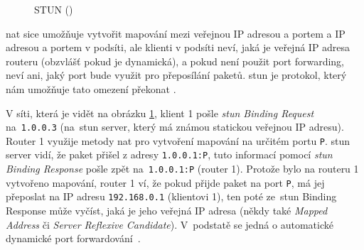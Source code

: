 \begin{figure}[H]
    \centering
    \caption{STUN (\publicPrivateIP)}
    \label{stunFig}
\end{figure}

\gls{nat} sice umožňuje vytvořit mapování mezi veřejnou IP adresou a portem a IP
adresou a portem v podsíti, ale klienti v podsíti neví, jaká je veřejná IP
adresa routeru (obzvlášť pokud je dynamická), a pokud není použit port
forwarding, neví ani, jaký port bude využit pro přeposílání paketů. \gls{stun}
je protokol, který nám umožňuje tato omezení překonat
\parencite{WebRTCForTheCurious}.

V síti, která je vidět na obrázku \ref{stunFig}, klient 1 pošle
\textit{\gls{stun} Binding Request} na~\texttt{1.0.0.3} (na~\gls{stun}
server, který má známou statickou veřejnou IP adresu). Router 1 využije metody
\gls{nat} pro vytvoření mapování na určitém portu \texttt{P}.
\gls{stun} server vidí, že paket přišel z adresy \texttt{1.0.0.1:P},
tuto informací pomocí \textit{\gls{stun} Binding Response} pošle zpět
na~\texttt{1.0.0.1:P} (router 1). Protože bylo na routeru 1 vytvořeno
mapování, router 1 ví, že pokud přijde paket na port \texttt{P}, má
jej přeposlat na IP adresu \texttt{192.168.0.1} (klientovi 1), ten
poté ze~\gls{stun} Binding Response může vyčíst, jaká je jeho veřejná IP adresa
(někdy také \textit{Mapped Address} či \textit{Server Reflexive Candidate}).
V~podstatě se jedná o automatické dynamické port
forwardování~\parencite{WebRTCForTheCurious}.

